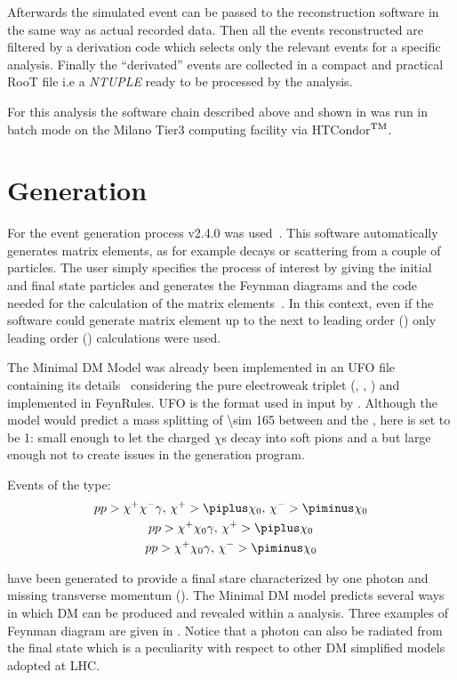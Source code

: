 Afterwards the simulated event can be passed to the reconstruction software in the same way as actual recorded data. Then all the events reconstructed are filtered by a derivation code which selects only the  relevant events for a specific analysis. Finally the ``derivated'' events are collected in a compact and practical RooT file i.e a \emph{NTUPLE} ready to be processed by the analysis.

For this analysis the software chain described above and shown in \Fig{\ref{fig:chain}} was run in batch mode on the Milano Tier3 computing facility via HTCondor$^{\textup{TM}}$.



\section{Generation}

For the event generation process \MGMCatNLO v2.4.0 was used~\cite{madgraph}. This software automatically generates matrix elements, as for example decays or scattering from a couple of particles. The user simply specifies the process of interest by giving the initial and final state particles and \MADGRAPH generates the Feynman diagrams and the code needed for the calculation of the matrix elements~\cite{Pottgen:2016807}. In this context, even if the software could generate matrix element up to the next to leading order (\NLO) only leading order (\LO) calculations were used.

The Minimal DM Model was already been implemented in an UFO file containing its details~\cite{mperego} considering the pure electroweak triplet (\chip\!, \chizero\!, \chim\!) and implemented in FeynRules. UFO is the format used in input by \MADGRAPH. Although the model would predict a mass splitting of \SI{\sim 165}{\mev} between \chipm and the \chizero, here is set to be \SI{1}{\gev}: small enough to let the charged $\chi$s decay into soft pions and a \chizero but large enough not to create issues in the generation program. 

Events of the type: 
\begin{gather*}
p p > \chi^+ \chi^- \gamma,\, \chi^+ > \piplus \chi_0,\, \chi^- > \piminus \chi_0\\
p p > \chi^+ \chi_0 \gamma,\, \chi^+ > \piplus \chi_0\\
p p > \chi^+ \chi_0 \gamma,\, \chi^- > \piminus \chi_0
\end{gather*}
 
have been generated to provide a final stare characterized by one photon and missing transverse momentum (\met). The Minimal DM model predicts several ways in which DM can be produced and revealed within a \mph analysis. Three examples of Feynman diagram are given in \Fig{\ref{fig:feynman}}. Notice that a photon can also be radiated from the final state which is a peculiarity with respect to other DM simplified models adopted at LHC.

